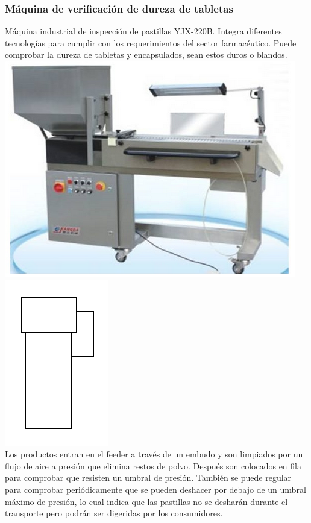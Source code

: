 	\newpage

	\subsubsection{Máquina de verificación de dureza de tabletas}

		
	Máquina industrial de inspección de pastillas YJX-220B. Integra diferentes tecnologías para cumplir con los requerimientos del sector farmacéutico. Puede comprobar la dureza de tabletas y encapsulados, sean estos duros o blandos.\\


	\includegraphics[scale=0.6]{Datasheets/3Foto.png}\hfill
	\includegraphics[scale=0.8]{Datasheets/Miniaturas/verificacion.png}\\

	Los productos entran en el feeder a través de un embudo y son limpiados por un flujo de aire a presión que elimina restos de polvo. Después son colocados en fila para comprobar que resisten un umbral de presión. También se puede regular para comprobar periódicamente que se pueden deshacer por debajo de un umbral máximo de presión, lo cual indica que las pastillas no se desharán durante el transporte pero podrán ser digeridas por los consumidores.\\


